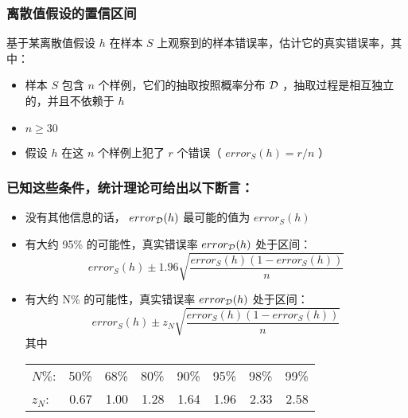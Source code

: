 \documentclass{beamer}
\begin{document}
\begin{frame}
\frametitle{离散值假设的置信区间}
\label{sec-2-5}

基于某离散值假设 $h$ 在样本 $S$ 上观察到的样本错误率，估计它的真实错误率，其中：
\begin{itemize}
\item 样本 $S$ 包含 $n$ 个样例，它们的抽取按照概率分布 $\cal D$ ，抽取过程是相互独立的，并且不依赖于 $h$
\item $n\geq 30$
\item 假设 $h$ 在这 $n$ 个样例上犯了 $r$ 个错误（ $error_S(h)=r/n$ ）
\end{itemize}
\end{frame}
\begin{frame}
\frametitle{已知这些条件，统计理论可给出以下断言：}
\label{sec-2-6}

\begin{itemize}
\item 没有其他信息的话， $error_{\cal{D}}(h)$ 最可能的值为 $error_S(h)$
\item 有大约 95\% 的可能性，真实错误率 $error_{\cal{D}}(h)$ 处于区间：
  $$error_{S}(h) \pm 1.96 \sqrt{\frac{error_{S}(h) (1 - error_{S}(h))}{n}}$$
\item 有大约 N\% 的可能性，真实错误率 $error_{\cal{D}}(h)$ 处于区间：
  $$error_{S}(h) \pm z_{N} \sqrt{\frac{error_{S}(h) (1 - error_{S}(h))}{n}}$$
    其中

\begin{center}
\begin{tabular}{lrrrrrrr}
 $N\%$:    &  50\%  &  68\%  &  80\%  &  90\%  &  95\%  &  98\%  &  99\%  \\
 $z_{N}$:  &  0.67  &  1.00  &  1.28  &  1.64  &  1.96  &  2.33  &  2.58  \\
\end{tabular}
\end{center}


\end{itemize}
\end{frame}
\end{document}
